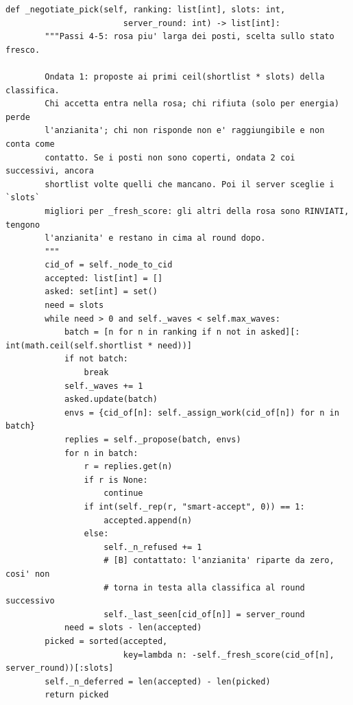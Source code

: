 \documentclass[11pt,a4paper]{article}
\begin{document}
\begin{lstlisting}[style=py,firstnumber=658,caption={\texttt{tesifl/strategies/sage\_smart.py}, lines 658--697}]
    def _negotiate_pick(self, ranking: list[int], slots: int,
                        server_round: int) -> list[int]:
        """Passi 4-5: rosa piu' larga dei posti, scelta sullo stato fresco.

        Ondata 1: proposte ai primi ceil(shortlist * slots) della classifica.
        Chi accetta entra nella rosa; chi rifiuta (solo per energia) perde
        l'anzianita'; chi non risponde non e' raggiungibile e non conta come
        contatto. Se i posti non sono coperti, ondata 2 coi successivi, ancora
        shortlist volte quelli che mancano. Poi il server sceglie i `slots`
        migliori per _fresh_score: gli altri della rosa sono RINVIATI, tengono
        l'anzianita' e restano in cima al round dopo.
        """
        cid_of = self._node_to_cid
        accepted: list[int] = []
        asked: set[int] = set()
        need = slots
        while need > 0 and self._waves < self.max_waves:
            batch = [n for n in ranking if n not in asked][: int(math.ceil(self.shortlist * need))]
            if not batch:
                break
            self._waves += 1
            asked.update(batch)
            envs = {cid_of[n]: self._assign_work(cid_of[n]) for n in batch}
            replies = self._propose(batch, envs)
            for n in batch:
                r = replies.get(n)
                if r is None:
                    continue
                if int(self._rep(r, "smart-accept", 0)) == 1:
                    accepted.append(n)
                else:
                    self._n_refused += 1
                    # [B] contattato: l'anzianita' riparte da zero, cosi' non
                    # torna in testa alla classifica al round successivo
                    self._last_seen[cid_of[n]] = server_round
            need = slots - len(accepted)
        picked = sorted(accepted,
                        key=lambda n: -self._fresh_score(cid_of[n], server_round))[:slots]
        self._n_deferred = len(accepted) - len(picked)
        return picked
\end{lstlisting}
\end{document}

